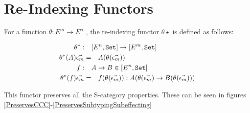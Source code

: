     \section{Re-Indexing Functors}
    \label{ReindexingFunctorProperties}
    For a function $\theta: E^m \rightarrow E^n$ , the re-indexing functor $\theta\star$ is defined as follows:
    
    \begin{align*}
        \theta^*:\quad& [E^n, \texttt{Set}] \rightarrow [E^m, \texttt{Set}]\\
        \theta^*(A)\vec{\epsilon_m}=&\quad A(\theta (\vec{\epsilon_m}))\\
        f:\quad& A \rightarrow B \in[E^n, \texttt{Set}]\\
        \theta^*(f)\vec{\epsilon_m} =&\quad f(\theta(\vec{\epsilon_m})): A(\theta(\vec{\epsilon_m})\rightarrow B(\theta(\vec{\epsilon_m})))
    \end{align*}
    
    This functor preserves all the S-category properties.
    These can be seen in figures \ref{PreservesCCC}-\ref{PreservesSubtypingSubeffecting}
    

